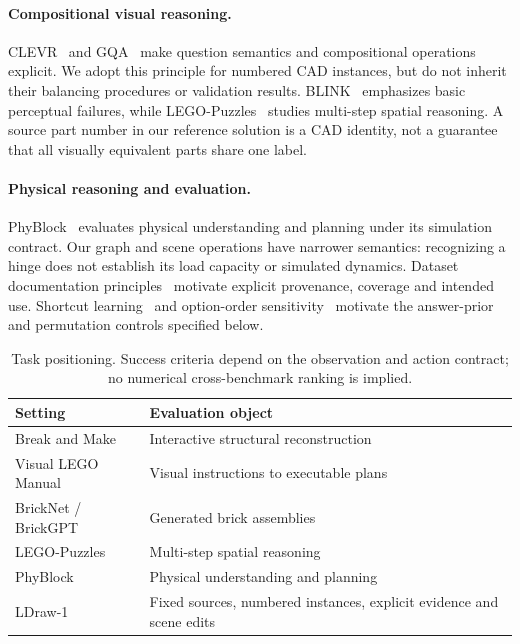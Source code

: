 \documentclass[10pt,twocolumn,letterpaper]{article}
\begin{document}
\paragraph{Compositional visual reasoning.}
CLEVR~\cite{johnson2017clevr} and GQA~\cite{hudson2019gqa} make question
semantics and compositional operations explicit. We adopt this principle
for numbered CAD instances, but do not inherit their balancing
procedures or validation results. BLINK~\cite{fu2024blink} emphasizes
basic perceptual failures, while LEGO-Puzzles~\cite{tang2025legopuzzles}
studies multi-step spatial reasoning. A source part number in our
reference solution is a CAD identity, not a guarantee that all visually
equivalent parts share one label.

\paragraph{Physical reasoning and evaluation.}
PhyBlock~\cite{ma2025phyblock} evaluates physical understanding and
planning under its simulation contract. Our graph and scene operations
have narrower semantics: recognizing a hinge does not establish its
load capacity or simulated dynamics. Dataset documentation
principles~\cite{gebru2021datasheets} motivate explicit provenance,
coverage and intended use. Shortcut learning~\cite{geirhos2020shortcut}
and option-order sensitivity~\cite{zheng2024selectors} motivate the
answer-prior and permutation controls specified below.

\begin{table}[t]
\centering\small
\caption{Task positioning. Success criteria depend on the observation
and action contract; no numerical cross-benchmark ranking is implied.}
\label{tab:related}
\begin{tabularx}{\linewidth}{lX}
\toprule
Setting & Evaluation object\\\midrule
Break and Make & Interactive structural reconstruction\\
Visual LEGO Manual & Visual instructions to executable plans\\
BrickNet / BrickGPT & Generated brick assemblies\\
LEGO-Puzzles & Multi-step spatial reasoning\\
PhyBlock & Physical understanding and planning\\
LDraw-1 & Fixed sources, numbered instances, explicit evidence and scene edits\\
\bottomrule
\end{tabularx}
\end{table}
\end{document}
